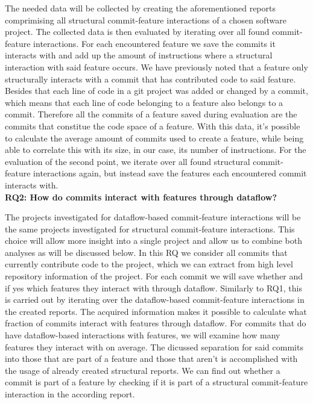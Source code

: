 The needed data will be collected by creating the aforementioned reports comprimising all structural commit-feature interactions of a chosen software project.
The collected data is then evaluated by iterating over all found commit-feature interactions.
For each encountered feature we save the commits it interacts with and add up the amount of instructions where a structural interaction with said feature occurs.
We have previously noted that a feature only structurally interacts with a commit that has contributed code to said feature.
Besides that each line of code in a git project was added or changed by a commit, which means that each line of code belonging to a feature also belongs to a commit.
Therefore all the commits of a feature saved during evaluation are the commits that constitue the code space of a feature. 
With this data, it's possible to calculate the average amount of commits used to create a feature, while being able to correlate this with its size, in our case, its number of instructions.
For the evaluation of the second point, we iterate over all found structural commit-feature interactions again, but instead save the features each encountered commit interacts with. \\

\textbf{RQ2: How do commits interact with features through dataflow?}

The projects investigated for dataflow-based commit-feature interactions will be the same projects investigated for structural commit-feature interactions.
This choice will allow more insight into a single project and allow us to combine both analyses as will be discussed below.
In this RQ we consider all commits that currently contribute code to the project, which we can extract from high level repository information of the project.
For each commit we will save whether and if yes which features they interact with through dataflow.
Similarly to RQ1, this is carried out by iterating over the dataflow-based commit-feature interactions in the created reports.
The acquired information makes it possible to calculate what fraction of commits interact with features through dataflow.
For commits that do have dataflow-based interactions with features, we will examine how many features they interact with on average.
The dicussed separation for said commits into those that are part of a feature and those that aren't is accomplished with the usage of already created structural reports. 
We can find out whether a commit is part of a feature by checking if it is part of a structural commit-feature interaction in the according report. \\

